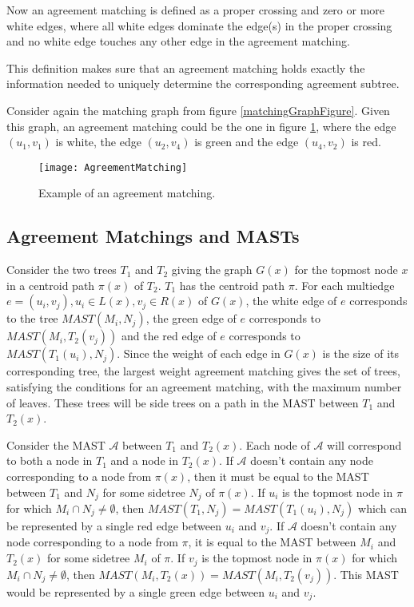 Now an agreement matching is defined as a proper crossing and zero or more white edges, where all white edges dominate the edge(s) in the proper crossing and no white edge touches any other edge in the agreement matching.

This definition makes sure that an agreement matching holds exactly the information needed to uniquely determine the corresponding agreement subtree.

Consider again the matching graph from figure \ref{matchingGraphFigure}. Given this graph, an agreement matching could be the one in figure \ref{agreementMatchingFigure}, where the edge $(u_1,v_1)$ is white, the edge $(u_2,v_4)$ is green and the edge $(u_4,v_2)$ is red.

\begin{figure}
	\texttt{[image: AgreementMatching]}
	\caption{Example of an agreement matching.}
	\label{agreementMatchingFigure}
\end{figure}

\subsection{Agreement Matchings and MASTs}
Consider the two trees $T_1$ and $T_2$ giving the graph $G(x)$ for the topmost node $x$ in a centroid path $\pi(x)$ of $T_2$. $T_1$ has the centroid path $\pi$. For each multiedge $e = (u_i, v_j), u_i \in L(x), v_j \in R(x)$ of $G(x)$, the white edge of $e$ corresponds to the tree $MAST(M_i, N_j)$, the green edge of $e$ corresponds to $MAST(M_i, T_2(v_j))$ and the red edge of $e$ corresponds to $MAST(T_1(u_i), N_j)$. Since the weight of each edge in $G(x)$ is the size of its corresponding tree, the largest weight agreement matching gives the set of trees, satisfying the conditions for an agreement matching, with the maximum number of leaves. These trees will be side trees on a path in the MAST between $T_1$ and $T_2(x)$.

Consider the MAST $\mathcal{A}$ between $T_1$ and $T_2(x)$. Each node of $\mathcal{A}$ will correspond to both a node in $T_1$ and a node in $T_2(x)$. If $\mathcal{A}$ doesn't contain any node corresponding to a node from $\pi(x)$, then it must be equal to the MAST between $T_1$ and $N_j$ for some sidetree $N_j$ of $\pi(x)$. If $u_i$ is the topmost node in $\pi$ for which $M_i \cap N_j \ne \emptyset$, then $MAST(T_1, N_j) = MAST(T_1(u_i), N_j)$ which can be represented by a single red edge between $u_i$ and $v_j$. If $\mathcal{A}$ doesn't contain any node corresponding to a node from $\pi$, it is equal to the MAST between $M_i$ and $T_2(x)$ for some sidetree $M_i$ of $\pi$. If $v_j$ is the topmost node in $\pi(x)$ for which $M_i \cap N_j \ne \emptyset$, then $MAST(M_i, T_2(x)) = MAST(M_i, T_2(v_j))$. This MAST would be represented by a single green edge between $u_i$ and $v_j$.

